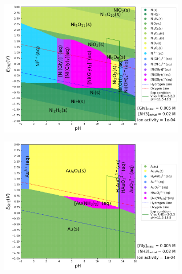 \documentclass[journal=jacsat,manuscript=article]{achemso}
\begin{document}
\begin{figure}[htbp]
    \centering
    \begin{subfigure}[b]{0.3\textwidth}
        \subcaption{}\label{fig:Ni_Pourbaix_NH3_Gly}
        \includegraphics[width=\textwidth]{Figures/pourbaix_diagrams/Ni-NH3-H2O_activity=1e-04_[NH3]=0.02M_[Gly]=0.005M_[CN]=0.png}
        \par\medskip
    \end{subfigure}
    \begin{subfigure}[b]{0.3\textwidth}
        \subcaption{}\label{fig:Au_Pourbaix_NH3_Gly}
        \includegraphics[width=\textwidth]{Figures/pourbaix_diagrams/Au-NH3-H2O_activity=1e-04_[NH3]=0.02M_[Gly]=0.005M_[CN]=0.png}

\end{subfigure}
\end{figure}
\end{document}
